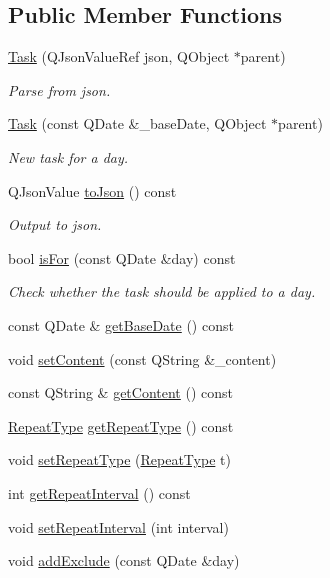 \subsection*{Public Member Functions}
\begin{DoxyCompactItemize}
\item 
\hyperlink{classTask_a3d57c110575c95c1330081ed1b1b1027}{Task} (Q\+Json\+Value\+Ref json, Q\+Object $\ast$parent)
\begin{DoxyCompactList}\small\item\em Parse from json. \end{DoxyCompactList}\item 
\hyperlink{classTask_aaa27e6562bc6404bb23f138d0396e9a9}{Task} (const Q\+Date \&\+\_\+base\+Date, Q\+Object $\ast$parent)
\begin{DoxyCompactList}\small\item\em New task for a day. \end{DoxyCompactList}\item 
Q\+Json\+Value \hyperlink{classTask_a5ffa10b62035b2a6de0a7acf4dbe60a5}{to\+Json} () const 
\begin{DoxyCompactList}\small\item\em Output to json. \end{DoxyCompactList}\item 
bool \hyperlink{classTask_a506d5da7826ae91f3e51e4691f81083f}{is\+For} (const Q\+Date \&day) const 
\begin{DoxyCompactList}\small\item\em Check whether the task should be applied to a day. \end{DoxyCompactList}\item 
const Q\+Date \& \hyperlink{classTask_a03199e980185fd24a07442ea375fece0}{get\+Base\+Date} () const 
\item 
void \hyperlink{classTask_a10cfbaedd28879927a579e14740f4a40}{set\+Content} (const Q\+String \&\+\_\+content)
\item 
const Q\+String \& \hyperlink{classTask_af5ae0c97475e8d95864ad811042b3667}{get\+Content} () const 
\item 
\hyperlink{classTask_a93fe2c7346381e2e631fb2ba63ac0344}{Repeat\+Type} \hyperlink{classTask_aa824ffb74b452fd79d24e82722e1e125}{get\+Repeat\+Type} () const 
\item 
void \hyperlink{classTask_ac61ce4293a793137e050c04cf085d362}{set\+Repeat\+Type} (\hyperlink{classTask_a93fe2c7346381e2e631fb2ba63ac0344}{Repeat\+Type} t)
\item 
int \hyperlink{classTask_a39181e9cb138b93ebba4e5108e236f5e}{get\+Repeat\+Interval} () const 
\item 
void \hyperlink{classTask_a47e36fa7a3acff3d747d58fc4ce62217}{set\+Repeat\+Interval} (int interval)
\item 
void \hyperlink{classTask_a33ae4045c8be35cf12d60eba969a7e0e}{add\+Exclude} (const Q\+Date \&day)
\end{DoxyCompactItemize}
